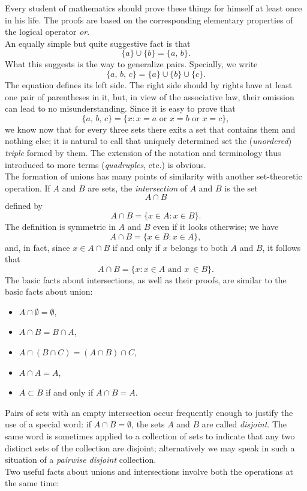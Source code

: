 Every student of mathematics should prove these things for himself at least once in his life. The proofs are based on the corresponding elementary properties of the logical operator \textit{or}.\\

An equally simple but quite suggestive fact is that
\[
	\{a\} \cup \{b\} = \{a, \, b\}.
\]
What this suggests is the way to generalize pairs. Specially, we write
\[
	\{a, \, b, \, c\} = \{a\} \cup\{b\} \cup \{c\}.
\]
The equation defines its left side. The right side should by rights have at least one pair of parentheses in it, but, in view of the associative law, their omission can lead to no misunderstanding. Since it is easy to prove that
\[
	\{a, \, b, \, c\} = \{ x : x = a \text{ or } x = b \text{ or } x = c\},
\]
we know now that for every three sets there exits a set that contains them and nothing else; it is natural to call that uniquely determined set the (\textit{unordered}) \textit{triple} formed by them. The extension of the notation and terminology thus introduced to more terms (\textit{quadruples}, etc.) is obvious.\\

The formation of unions has many points of similarity with another set-theoretic operation. If $A$ and $B$ are sets, the \textit{intersection} of $A$ and $B$ is the set
\[
	A \cap B
\]
defined by
\[
	A \cap B = \{ x \in A : x \in B\}.
\]
The definition is symmetric in $A$ and $B$ even if it looks otherwise; we have
\[
	A \cap B = \{ x \in B : x \in A\},
\]
and, in fact, since $x \in A \cap B$ if and only if $x$ belongs to both $A$ and $B$, it follows that
\[
	A \cap B = \{ x : x \in A \text{ and } x \ \in B\}.
\]
The basic facts about intersections, as well as their proofs, are similar to the basic facts about union:

\begin{itemize}
	\item $A \cap \emptyset = \emptyset$,
	\item $A \cap B = B \cap A$,
	\item $A \cap (B \cap C) = (A \cap B) \cap C$,
	\item $A \cap A = A$,
	\item $A \subset B$ if and only if $A \cap B = A$.
\end{itemize}

Pairs of sets with an empty intersection occur frequently enough to justify the use of a special word: if $A \cap B = \emptyset$, the sets $A$ and $B$ are called \textit{disjoint}. The same word is sometimes applied to a collection of sets to indicate that any two distinct sets of the collection are disjoint; alternatively we may speak in such a situation of a \textit{pairwise disjoint} collection.\\
Two useful facts about unions and intersections involve both the operations at the same time:

